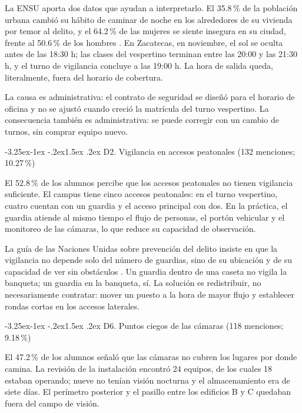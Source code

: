 \documentclass[11pt,a4paper]{article}
\makeatletter
\renewcommand\subsection{\@startsection{subsection}{2}{\z@}%
  {-3.25ex\@plus -1ex \@minus -.2ex}{1.5ex \@plus .2ex}%
  {\normalfont\large\bfseries\color{uazblue!85!black}}}
\makeatother
\begin{document}
La ENSU aporta dos datos que ayudan a interpretarlo. El 35.8\,\% de la población
urbana cambió su hábito de caminar de noche en los alrededores de su vivienda
por temor al delito, y el 64.2\,\% de las mujeres se siente insegura en su
ciudad, frente al 50.6\,\% de los hombres \cite{inegi2026ensu}. En Zacatecas,
en noviembre, el sol se oculta antes de las 18:30 h; las clases del vespertino
terminan entre las 20:00 y las 21:30 h, y el turno de vigilancia concluye a las
19:00 h. La hora de salida queda, literalmente, fuera del horario de cobertura.

La causa es administrativa: el contrato de seguridad se diseñó para el horario
de oficina y no se ajustó cuando creció la matrícula del turno vespertino. La
consecuencia también es administrativa: se puede corregir con un cambio de
turnos, sin comprar equipo nuevo.

\subsection{D2. Vigilancia en accesos peatonales (132 menciones; 10.27\,\%)}

El 52.8\,\% de los alumnos percibe que los accesos peatonales no tienen
vigilancia suficiente. El campus tiene cinco accesos peatonales: en el turno
vespertino, cuatro cuentan con un guardia y el acceso principal con dos. En la
práctica, el guardia atiende al mismo tiempo el flujo de personas, el portón
vehicular y el monitoreo de las cámaras, lo que reduce su capacidad de
observación.

La guía de las Naciones Unidas sobre prevención del delito insiste en que la
vigilancia no depende solo del número de guardias, sino de su ubicación y de su
capacidad de ver sin obstáculos \cite{unodc2010}. Un guardia dentro de una
caseta no vigila la banqueta; un guardia en la banqueta, sí. La solución es
redistribuir, no necesariamente contratar: mover un puesto a la hora de mayor
flujo y establecer rondas cortas en los accesos laterales.

\subsection{D6. Puntos ciegos de las cámaras (118 menciones; 9.18\,\%)}

El 47.2\,\% de los alumnos señaló que las cámaras no cubren los lugares por
donde camina. La revisión de la instalación encontró 24 equipos, de los cuales 18
estaban operando; nueve no tenían visión nocturna y el almacenamiento era de
siete días. El perímetro posterior y el pasillo entre los edificios B y C
quedaban fuera del campo de visión.
\end{document}
